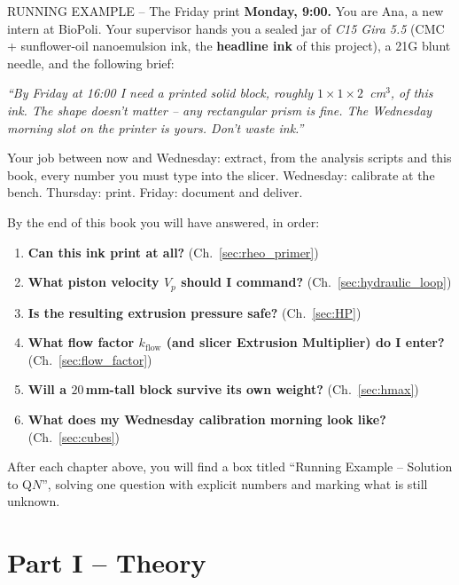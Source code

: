 \documentclass[11pt,a4paper]{article}
\begin{document}
\begin{runningbox}{RUNNING EXAMPLE -- The Friday print}
\textbf{Monday, 9:00.} You are Ana, a new intern at BioPoli. Your
supervisor hands you a sealed jar of \emph{C15 Gira 5.5} (CMC +
sunflower-oil nanoemulsion ink, the \textbf{headline ink} of this
project), a 21G blunt needle, and the following brief:

\medskip
\textsl{``By Friday at 16:00 I need a printed solid block, roughly
$1\times 1\times 2$~cm$^3$, of this ink. The shape doesn't matter -- any
rectangular prism is fine. The Wednesday morning slot on the printer
is yours. Don't waste ink.''}

\medskip
Your job between now and Wednesday: extract, from the analysis scripts
and this book, every number you must type into the slicer. Wednesday:
calibrate at the bench. Thursday: print. Friday: document and deliver.

\medskip
By the end of this book you will have answered, in order:
\begin{enumerate}[leftmargin=1.6em,itemsep=1pt]
\item \textbf{Can this ink print at all?} (Ch.~\ref{sec:rheo_primer})
\item \textbf{What piston velocity $V_p$ should I command?} (Ch.~\ref{sec:hydraulic_loop})
\item \textbf{Is the resulting extrusion pressure safe?} (Ch.~\ref{sec:HP})
\item \textbf{What flow factor $k_\mathrm{flow}$ (and slicer Extrusion Multiplier) do I enter?} (Ch.~\ref{sec:flow_factor})
\item \textbf{Will a $20$\,mm-tall block survive its own weight?} (Ch.~\ref{sec:hmax})
\item \textbf{What does my Wednesday calibration morning look like?} (Ch.~\ref{sec:cubes})
\end{enumerate}
After each chapter above, you will find a box titled ``Running Example --
Solution to Q$N$'', solving one question with explicit numbers and
marking what is still unknown.
\end{runningbox}

\part*{Part I -- Theory}
\end{document}
